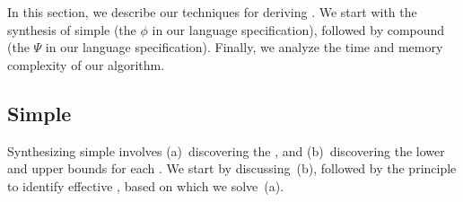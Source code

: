 
 In this section, we describe our techniques for deriving \dis. We
start with the synthesis of simple \invariants (the $\phi$ \invariants in
our language specification), followed by compound \invariants (the $\Psi$
\invariants in our language specification). Finally, we analyze the time and
memory complexity of our algorithm.

\subsection{Simple \DIs}\label{sec:conjunctive} Synthesizing simple \dis
involves (a)~discovering the \views, and (b)~discovering the lower and upper
bounds for each \view. We start by discussing~(b), followed by the principle to
identify effective \views, based on which we solve~(a).


